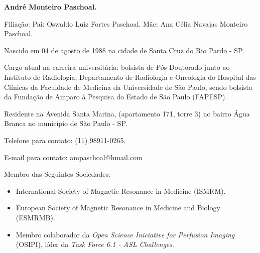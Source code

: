 \documentclass[a4paper,oneside,10pt]{article}
\begin{document}
\begin{itemize}
        \large{\item \textbf{André Monteiro Paschoal.}}
        \item Filiação: \newline
        Pai: Oswaldo Luiz Fortes Paschoal. \newline
        Mãe: Ana Célia Navajas Monteiro Paschoal.
        \item Nascido em 04 de agosto de 1988 na cidade de Santa Cruz do Rio Pardo - SP.
        \item Cargo atual na carreira universitária: bolsista de Pós-Doutorado junto ao Instituto de Radiologia, Departamento de Radiologia e Oncologia do Hospital das Clínicas da Faculdade de Medicina da Universidade de São Paulo, sendo bolsista da Fundação de Amparo à Pesquisa do Estado de São Paulo (FAPESP).
        \item Residente na Avenida Santa Marina, (apartamento 171, torre 3) no bairro Água Branca no município de São Paulo - SP.
        \item Telefone para contato: (11) 98911-0265.
        \item E-mail para contato: ampaschoal@hmail.com 
        \item Membro das Seguintes Sociedades:
        \begin{itemize}
                \item International Society of Magnetic Resonance in Medicine (ISMRM).
                \item European Society of Magnetic Resonance in Medicine and Biology (ESMRMB).
                \item Membro colaborador da \textit{Open Science Iniciative for Perfusion Imaging} (OSIPI), líder da \textit{Task Force 6.1 - ASL Challenges}.
        \end{itemize} 
\end{itemize}

\newpage
\end{document}

